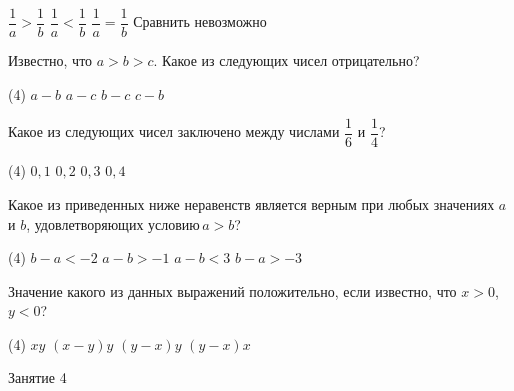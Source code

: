 \begin{class}[number=3]
\begin{listofex}
\begin{tasks}
			\task \( \dfrac{1}{a}>\dfrac{1}{b} \)
			\task \( \dfrac{1}{a}<\dfrac{1}{b} \)
			\task \( \dfrac{1}{a}=\dfrac{1}{b} \)
			\task Сравнить невозможно
		\end{tasks}
		\item Известно, что \( a>b>c \). Какое из следующих чисел отрицательно?
		\begin{tasks}(4)
			\task \( a-b \)
			\task \( a-c \)
			\task \( b-c \)
			\task \( c-b \)
		\end{tasks}
		\item Какое из следующих чисел заключено между числами \( \dfrac{1}{6} \) и \( \dfrac{1}{4} \)?
		\begin{tasks}(4)
			\task \( 0,1 \)
			\task \( 0,2 \)
			\task \( 0,3 \)
			\task \( 0,4 \)
		\end{tasks}
		\item Какое из приведенных ниже неравенств является верным при любых значениях \( a \) и \( b \), удовлетворяющих условию \( a>b \)?
		\begin{tasks}(4)
			\task \( b-a<-2 \)
			\task \( a-b>-1 \)
			\task \( a-b<3 \)
			\task \( b-a>-3 \)
		\end{tasks}
		\newpage
		\item Значение какого из данных выражений положительно, если известно, что \( x>0 \), \( y<0 \)?
		\begin{tasks}(4)
			\task \( xy \)
			\task \( (x-y)y \)
			\task \( (y-x)y \)
			\task \( (y-x)x \)
		\end{tasks}
	\end{listofex}
\end{class}

\begin{class}[number=4]
	\begin{listofex}
		\item Занятие 4
	\end{listofex}
\end{class}

